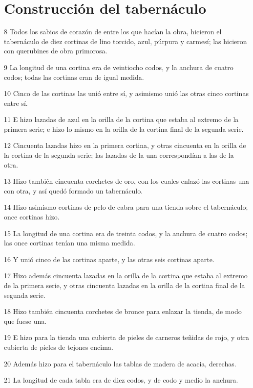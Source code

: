 \section*{Construcción del tabernáculo}

\par 8 Todos los sabios de corazón de entre los que hacían la obra, hicieron el tabernáculo de diez cortinas de lino torcido, azul, púrpura y carmesí; las hicieron con querubines de obra primorosa.
\par 9 La longitud de una cortina era de veintiocho codos, y la anchura de cuatro codos; todas las cortinas eran de igual medida.
\par 10 Cinco de las cortinas las unió entre sí, y asimismo unió las otras cinco cortinas entre sí.
\par 11 E hizo lazadas de azul en la orilla de la cortina que estaba al extremo de la primera serie; e hizo lo mismo en la orilla de la cortina final de la segunda serie.
\par 12 Cincuenta lazadas hizo en la primera cortina, y otras cincuenta en la orilla de la cortina de la segunda serie; las lazadas de la una correspondían a las de la otra.
\par 13 Hizo también cincuenta corchetes de oro, con los cuales enlazó las cortinas una con otra, y así quedó formado un tabernáculo.
\par 14 Hizo asimismo cortinas de pelo de cabra para una tienda sobre el tabernáculo; once cortinas hizo.
\par 15 La longitud de una cortina era de treinta codos, y la anchura de cuatro codos; las once cortinas tenían una misma medida.
\par 16 Y unió cinco de las cortinas aparte, y las otras seis cortinas aparte.
\par 17 Hizo además cincuenta lazadas en la orilla de la cortina que estaba al extremo de la primera serie, y otras cincuenta lazadas en la orilla de la cortina final de la segunda serie.
\par 18 Hizo también cincuenta corchetes de bronce para enlazar la tienda, de modo que fuese una.
\par 19 E hizo para la tienda una cubierta de pieles de carneros teñidas de rojo, y otra cubierta de pieles de tejones encima.
\par 20 Además hizo para el tabernáculo las tablas de madera de acacia, derechas.
\par 21 La longitud de cada tabla era de diez codos, y de codo y medio la anchura.
